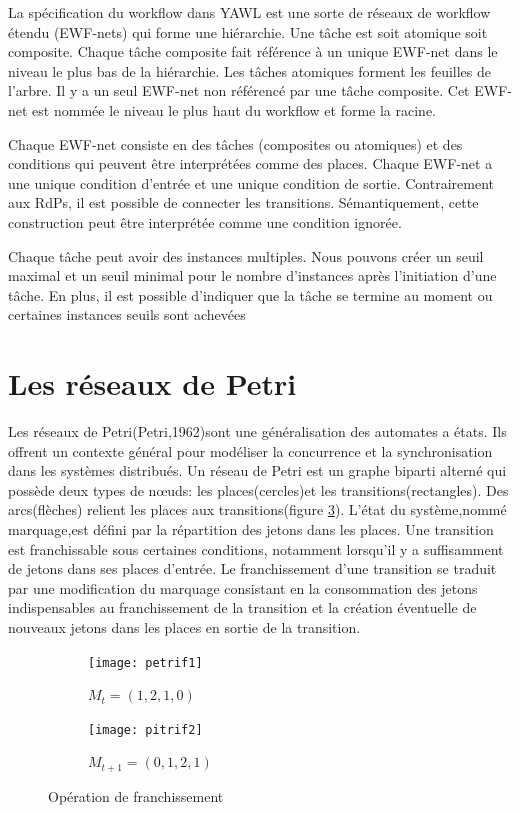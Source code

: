La spécification du workflow dans YAWL est une sorte de réseaux de workflow étendu (EWF-nets) qui forme une hiérarchie. Une tâche est soit atomique soit composite. Chaque tâche composite fait référence à un unique EWF-net dans le niveau le plus bas de la hiérarchie. Les tâches atomiques forment les feuilles de l'arbre. Il y a un seul EWF-net non référencé par une tâche composite. Cet EWF-net est nommée le niveau le plus haut du workflow et forme la racine. 

Chaque EWF-net consiste en des tâches (composites ou atomiques) et des conditions qui peuvent être interprétées comme des places. 
Chaque EWF-net a une unique condition d'entrée et une unique condition de sortie. Contrairement aux RdPs, il est possible de connecter les transitions. Sémantiquement, cette construction peut être interprétée comme une condition ignorée.

Chaque tâche peut avoir des instances multiples. Nous pouvons créer un seuil maximal et un seuil minimal pour le nombre d'instances après l'initiation d'une tâche. En plus, il est possible d'indiquer que la tâche se termine au moment ou certaines instances seuils sont achevées

\section{Les réseaux de Petri}

Les réseaux de Petri(Petri,1962)sont une généralisation des automates a états. Ils offrent un contexte général pour modéliser la concurrence et la synchronisation dans les systèmes distribués. Un réseau de Petri est un graphe biparti alterné qui possède deux types de nœuds: les places(cercles)et les transitions(rectangles). Des arcs(flèches) relient les places aux transitions(figure \ref{fig:2 rdp}). L'état du système,nommé marquage,est défini par la répartition des jetons dans les places. Une transition est franchissable sous certaines conditions, notamment lorsqu'il y a suffisamment de jetons dans ses places d’entrée. Le franchissement d’une transition se traduit par une modification du marquage consistant en la consommation des jetons indispensables au franchissement de la transition et la création éventuelle de nouveaux jetons dans les places en sortie de la transition.
\begin{figure}[h]
	\centering
	
	\begin{subfigure}[b]{0.3\textwidth}
		\centering
		\texttt{[image: petrif1]}
		\caption{$M_{t}=(1,2,1,0)$}
		\label{fig:three sin x}
	\end{subfigure}
	\hfill
	\begin{subfigure}[b]{0.3\textwidth}
		\centering
		\texttt{[image: pitrif2]}
		\caption{$M_{t+1}=(0,1,2,1)$}
		\label{fig:five over x}
	\end{subfigure}
	
	\caption{Opération de franchissement}
	\label{fig:2 rdp}
\end{figure}

